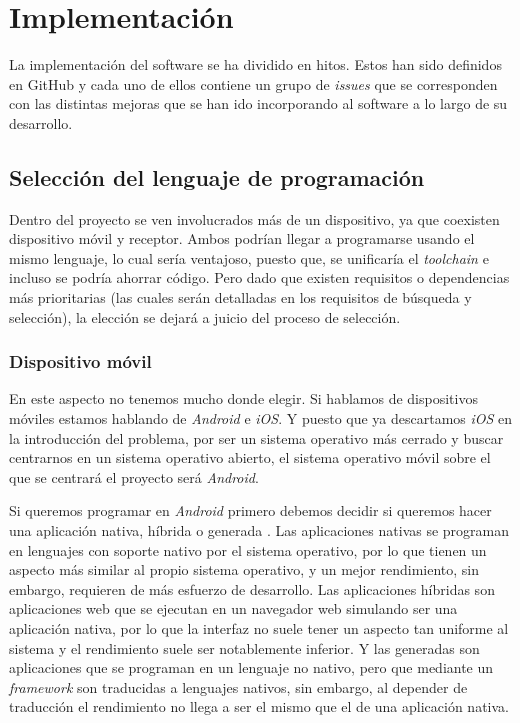 \chapter{Implementación}

La implementación del software se ha dividido en hitos. Estos han sido definidos en GitHub
y cada uno de ellos contiene un grupo de \textit{issues} que se corresponden con las distintas
mejoras que se han ido incorporando al software a lo largo de su desarrollo.\\

\section{Selección del lenguaje de programación}

Dentro del proyecto se ven involucrados más de un dispositivo, ya que coexisten
dispositivo móvil y receptor. Ambos podrían llegar a programarse usando el mismo
lenguaje, lo cual sería ventajoso, puesto que, se unificaría el \emph{toolchain} e
incluso se podría ahorrar código. Pero dado que existen requisitos o
dependencias más prioritarias (las cuales serán detalladas en los requisitos de
búsqueda y selección), la elección se dejará a juicio del proceso de selección.

\subsection{Dispositivo móvil}

En este aspecto no tenemos mucho donde elegir. Si hablamos de dispositivos
móviles estamos hablando de \emph{Android} e \emph{iOS}. Y puesto que ya
descartamos \emph{iOS} en la introducción del problema, por ser un sistema
operativo más cerrado y buscar centrarnos en un sistema operativo abierto, el
sistema operativo móvil sobre el que se centrará el proyecto será \emph{Android}.

Si queremos programar en \emph{Android} primero debemos decidir si queremos hacer una
aplicación nativa, híbrida o generada \cite{nativo-hibrido-generado}. Las
aplicaciones nativas se programan en lenguajes con soporte nativo por el sistema
operativo, por lo que tienen un aspecto más similar al propio sistema operativo,
y un mejor rendimiento, sin embargo, requieren de más esfuerzo de desarrollo. Las
aplicaciones híbridas son aplicaciones web que se ejecutan en un navegador web
simulando ser una aplicación nativa, por lo que la interfaz no suele tener un
aspecto tan uniforme al sistema y el rendimiento suele ser notablemente
inferior. Y las generadas son aplicaciones que se programan en un lenguaje no
nativo, pero que mediante un \emph{framework} son traducidas a lenguajes nativos, sin
embargo, al depender de traducción el rendimiento no llega a ser el mismo que el
de una aplicación nativa.

